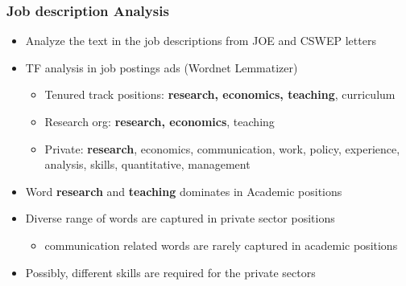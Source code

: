 \documentclass[10pt,svgnames,fragile]{beamer}
\begin{document}
{	
	\begin{frame}
		\frametitle{Job description Analysis}
		\begin{itemize}
			\item Analyze the text in the job descriptions from JOE and CSWEP letters
			\vfill
			\item TF analysis in job postings ads (Wordnet Lemmatizer)
			\begin{itemize}
				\vspace{1 mm}
				\item Tenured track positions: \textbf{research, economics, teaching}, curriculum
				\vspace{1 mm}
				\item Research org: \textbf{research, economics}, teaching
				\vspace{1 mm}
				\item Private: \textbf{research}, economics, communication, work, policy, experience, analysis, skills, quantitative, management
			\end{itemize}
			\vfill		
			\item Word \textbf{research} and \textbf{teaching} dominates in Academic positions
			\vfill
			\item Diverse range of words are captured in private sector positions
			\vspace{1 mm}
			\begin{itemize}
				\item communication related words are rarely captured in academic positions
			\end{itemize} 
			\vfill
			\item Possibly, different skills are required for the private sectors 
			\vfill
		\end{itemize}
	\end{frame}
	
	

}
\end{document}
